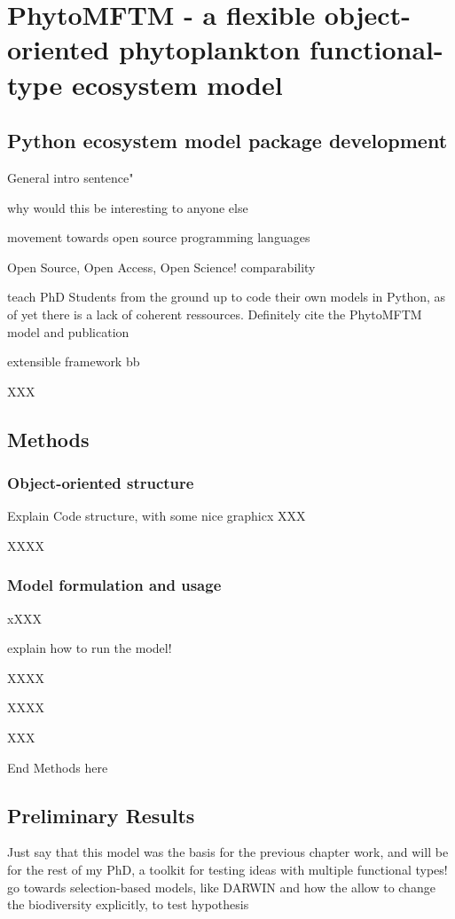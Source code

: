\chapter{PhytoMFTM - a flexible object-oriented phytoplankton functional-type ecosystem model}

\small {\textbf{}}


\normalsize
\section{Python ecosystem model package development}
General intro sentence" 

why would this be interesting to anyone else


movement towards open source programming languages

Open Source, Open Access, Open Science!
comparability

teach PhD Students from the ground up to code their own models in Python, as of yet there is a lack of coherent ressources. Definitely cite the PhytoMFTM model and publication \citep{AcevedoTrejos2016}

extensible framework
bb



XXX

\section{Methods}



\subsection{Object-oriented structure}
Explain Code structure, with some nice graphicx
XXX

XXXX

\subsection{Model formulation and usage}
xXXX

explain how to run the model!

XXXX

XXXX

XXX


End Methods here

\section{Preliminary Results}


Just say that this model was the basis for the previous chapter work, and will be for the rest of my PhD, a toolkit for testing ideas with multiple functional types! go towards selection-based models, like DARWIN
and how the allow to change the biodiversity explicitly, to test hypothesis

